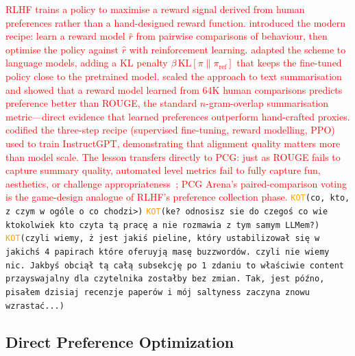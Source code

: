 \documentclass[shortabstract, mgr, english]{iithesis}
\newcommand{\DEBUG}[1]{{#1}} %
\newcommand{\KOT}[1]{\DEBUG{\tt{\textcolor{orange}{KOT}(}{#1}{)}}}
\newcommand{\changed}[1]{\textcolor{red}{#1}}
\begin{document}
\changed{RLHF trains a policy to maximise a reward signal derived from human
preferences rather than a hand-designed reward function.
\citet{christiano2017deep} introduced the modern recipe: learn a reward model
$\hat{r}$ from pairwise comparisons of behaviour, then optimise the policy
against $\hat{r}$ with reinforcement learning. \citet{ziegler2019fine} adapted
the scheme to language models, adding a KL penalty
$\beta\,\mathrm{KL}[\pi \| \pi_{\mathrm{ref}}]$ that keeps the fine-tuned
policy close to the pretrained model. \citet{stiennon2020learning} scaled the
approach to text summarisation and showed that a reward model learned from 64K
human comparisons predicts preference better than ROUGE, the standard
$n$-gram-overlap summarisation metric---direct evidence that learned
preferences outperform hand-crafted proxies. \citet{ouyang2022training}
codified the three-step recipe (supervised fine-tuning, reward modelling, PPO)
used to train InstructGPT, demonstrating that alignment quality matters more
than model scale. The lesson transfers directly to PCG: just as ROUGE fails to
capture summary quality, automated level metrics fail to fully capture fun,
aesthetics, or challenge appropriateness~\citep{marino2015empirical}; PCG
Arena's paired-comparison voting is the game-design analogue of RLHF's
preference collection phase.}
\KOT{co, kto, z czym w ogóle o co chodzi>}
\KOT{ke? odnosisz sie do czegoś co wie ktokolwiek kto czyta tą pracę a nie rozmawia z tym samym LLMem?}
\KOT{czyli wiemy, ż jest jakiś pieline, który ustabilizował się w jakichś 4 papirach które oferuyją masę buzzwordów. czyli nie wiemy nic. Jakbyś obciął tą całą subsekcję po 1 zdaniu to właściwie content przayswajalny dla czytelnika zostałby bez zmian. Tak, jest późno, pisałem dzisiaj recenzje paperów i mój saltyness zaczyna znowu wzrastać...}


\subsection{Direct Preference Optimization}
\label{subsec:bg-dpo}
\end{document}
